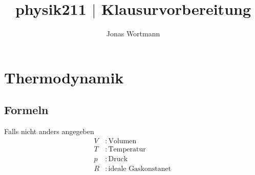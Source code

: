 \documentclass[a4paper,12pt]{article}
\numberwithin{equation}{section}
\begin{document}

\title{physik211 $|$ Klausurvorbereitung}
\author{Jonas Wortmann}
\maketitle
{}


\newpage


\fancyhead[L]{\thepage}
\fancyfoot[C]{}

\tableofcontents


\newpage

\fancyhead[R]{\leftmark\\\rightmark}


\section{Thermodynamik}


\subsection{Formeln}
Falls nicht anders angegeben
\begin{align} 
        V&:\,\text{Volumen}\,\nonumber \\
        T&:\,\text{Temperatur}\,\nonumber \\
        p&:\,\text{Druck}\,\nonumber \\
        R&:\,\text{ideale Gaskonstanet}\,\nonumber 
\end{align} 
\end{document}
